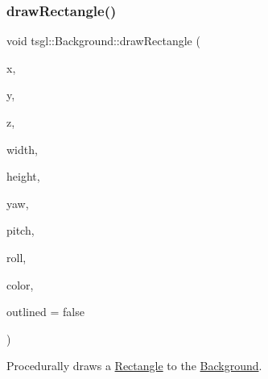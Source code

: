 \subsubsection{\texorpdfstring{draw\+Rectangle()}{drawRectangle()}\hspace{0.1cm}{\footnotesize\ttfamily [1/2]}}
{\footnotesize\ttfamily void tsgl\+::\+Background\+::draw\+Rectangle (\begin{DoxyParamCaption}\item[{float}]{x,  }\item[{float}]{y,  }\item[{float}]{z,  }\item[{float}]{width,  }\item[{float}]{height,  }\item[{float}]{yaw,  }\item[{float}]{pitch,  }\item[{float}]{roll,  }\item[{\hyperlink{structtsgl_1_1_color_float}{Color\+Float}}]{color,  }\item[{bool}]{outlined = {\ttfamily false} }\end{DoxyParamCaption})\hspace{0.3cm}{\ttfamily [virtual]}}



Procedurally draws a \hyperlink{classtsgl_1_1_rectangle}{Rectangle} to the \hyperlink{classtsgl_1_1_background}{Background}. 

